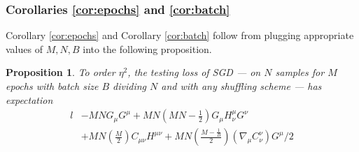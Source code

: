 \documentclass[anon,12pt]{colt2021} %
\newtheorem{prop}{Proposition}
\newcommand{\wrap}[1]{\left(#1\right)}
\begin{document}
        \subsubsection{Corollaries \ref{cor:epochs} and \ref{cor:batch}}

            Corollary \ref{cor:epochs} and Corollary \ref{cor:batch} follow
            from plugging appropriate values of $M, N, B$ into the following
            proposition.

            \begin{prop}\label{prop:ordtwo}
                To order $\eta^2$, the testing loss of SGD --- on $N$
                samples for $M$ epochs with batch size $B$ dividing $N$ and with any
                shuffling scheme --- has expectation
                {\small
                \begin{align*}
                                                            l              
                    &- MN                                   G_\mu G^\mu       
                     + MN\wrap{MN - \frac{1}{2}}            G_\mu H^{\mu}_{\nu} G^\nu \\
                    &+ MN\wrap{\frac{M}{2}}                 C_{\mu \nu} H^{\mu \nu}
                     + MN\wrap{\frac{M-\frac{1}{B}}{2}}     \wrap{\nabla_\mu C^{\nu}_{\nu}} G^\mu / 2
                \end{align*}
                }
            \end{prop}
\end{document}
